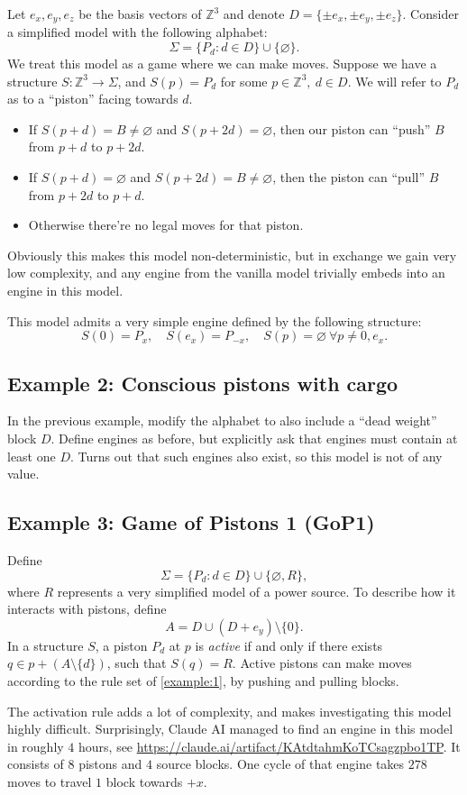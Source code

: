 \documentclass[12pt]{article}
\newcommand{\Z}{\mathbb{Z}}
\theoremstyle{remark}
\theoremstyle{definition}
\begin{document}
Let $e_x, e_y, e_z$ be the basis vectors of $\Z^3$ and denote $D=\{\pm e_x, \pm e_y, \pm e_z\}$.
Consider a simplified model with the following alphabet:
$$\Sigma=\{P_d : d \in D\} \cup \{\varnothing\}.$$
We treat this model as a game where we can make moves. Suppose we have a structure $S: \Z^3\to\Sigma$, and
$S(p)=P_d$ for some $p\in\Z^3,\ d\in D$. We will refer to $P_d$ as to a ``piston'' facing towards $d$.
\begin{itemize}
    \item If $S(p+d)=B\neq\varnothing$ and $S(p+2d)=\varnothing$, then our piston can ``push'' $B$ from $p+d$ to $p+2d$.
    \item If $S(p+d)=\varnothing$ and $S(p+2d)=B\neq\varnothing$, then the piston can ``pull'' $B$ from $p+2d$ to $p+d$.
    \item Otherwise there're no legal moves for that piston.
\end{itemize}
Obviously this makes this model non-deterministic, but in exchange we gain very low complexity, and any engine from the vanilla model trivially embeds into an engine in this model.

This model admits a very simple engine defined by the following structure:
$$S(0)=P_x, \quad S(e_x)=P_{-x}, \quad S(p)=\varnothing \ \forall p\neq0,e_x.$$

\subsection{Example 2: Conscious pistons with cargo}
In the previous example, modify the alphabet to also include a ``dead weight'' block $D$. Define engines as before, but explicitly ask that engines must contain at least one $D$.
Turns out that such engines also exist, so this model is not of any value.

\subsection{Example 3: Game of Pistons 1 (GoP1)} \label{example:gop1}
Define $$\Sigma=\{P_d : d \in D\} \cup \{\varnothing, R\},$$
where $R$ represents a very simplified model of a power source. To describe how it interacts with pistons, define
$$A=D\cup(D+e_y)\setminus\{0\}.$$
In a structure $S$, a piston $P_d$ at $p$ is \emph{active} if and only if there exists $q \in p+(A\setminus\{d\})$, such that $S(q)=R$.
Active pistons can make moves according to the rule set of \ref{example:1}, by pushing and pulling blocks.

The activation rule adds a lot of complexity, and makes investigating this model highly difficult. Surprisingly, Claude AI managed to find an engine in this model in roughly $4$ hours, see
\url{https://claude.ai/artifact/KAtdtahmKoTCsagzpbo1TP}. It consists of $8$ pistons and $4$ source blocks.
One cycle of that engine takes $278$ moves to travel $1$ block towards $+x$.
\end{document}
